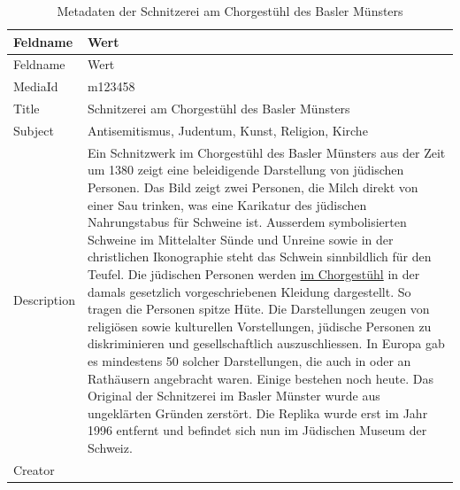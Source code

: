 \documentclass[
  nswissgerman,
  letterpaper,
  DIV=11,
  numbers=noendperiod]{scrartcl}
\begin{document}
\begin{longtable}[]{@{}
  >{\raggedright\arraybackslash}p{}
  >{\raggedright\arraybackslash}p{}@{}}
\caption{Metadaten der Schnitzerei am Chorgestühl des Basler
Münsters}\label{tbl-metadaten-schnitzerei-am-chorgestuehl-des-basler-muensters}\tabularnewline
\toprule\noalign{}
\begin{minipage}[b]{\linewidth}\raggedright
Feldname
\end{minipage} & \begin{minipage}[b]{\linewidth}\raggedright
Wert
\end{minipage} \\
\midrule\noalign{}
\endfirsthead
\toprule\noalign{}
\begin{minipage}[b]{\linewidth}\raggedright
Feldname
\end{minipage} & \begin{minipage}[b]{\linewidth}\raggedright
Wert
\end{minipage} \\
\midrule\noalign{}
\endhead
\bottomrule\noalign{}
\endlastfoot
MediaId & m123458 \\
Title & Schnitzerei am Chorgestühl des Basler Münsters \\
Subject & Antisemitismus, Judentum, Kunst, Religion, Kirche \\
Description & Ein Schnitzwerk im Chorgestühl des Basler Münsters aus der
Zeit um 1380 zeigt eine beleidigende Darstellung von jüdischen Personen.
Das Bild zeigt zwei Personen, die Milch direkt von einer Sau trinken,
was eine Karikatur des jüdischen Nahrungstabus für Schweine ist.
Ausserdem symbolisierten Schweine im Mittelalter Sünde und Unreine sowie
in der christlichen Ikonographie steht das Schwein sinnbildlich für den
Teufel. Die jüdischen Personen werden
\href{https://www.gra.ch/bildung/glossar/judensau/}{im Chorgestühl} in
der damals gesetzlich vorgeschriebenen Kleidung dargestellt. So tragen
die Personen spitze Hüte. Die Darstellungen zeugen von religiösen sowie
kulturellen Vorstellungen, jüdische Personen zu diskriminieren und
gesellschaftlich auszuschliessen. In Europa gab es mindestens 50 solcher
Darstellungen, die auch in oder an Rathäusern angebracht waren. Einige
bestehen noch heute. Das Original der Schnitzerei im Basler Münster
wurde aus ungeklärten Gründen zerstört. Die Replika wurde erst im Jahr
1996 entfernt und befindet sich nun im Jüdischen Museum der Schweiz. \\
Creator & \\

\end{longtable}
\end{document}
